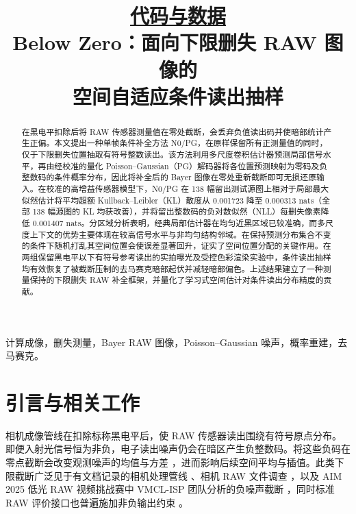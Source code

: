 \documentclass[10pt,twocolumn,journal]{IEEEtran}
\begin{document}
\title{{\normalsize \href{https://github.com/y-g-jiang/Video-RAW-Black-Level-Correction-Net/tree/main/below_zero}{代码与数据}}\\[6pt]Below Zero：面向下限删失 RAW 图像的\\空间自适应条件读出抽样}
\author{\BZAuthorBlockZH}
\maketitle
\thispagestyle{fancy}

\begin{abstract}
在黑电平扣除后将 RAW 传感器测量值在零处截断，会丢弃负值读出码并使暗部统计产生正偏。本文提出一种单帧条件补全方法 N0/PG，在原样保留所有正测量值的同时，仅于下限删失位置抽取有符号整数读出。该方法利用多尺度卷积估计器预测局部信号水平，再由经校准的量化 Poisson--Gaussian（PG）解码器将各位置预测映射为零码及负整数码的条件概率分布，因此将补全后的 Bayer 图像在零处重新截断即可无损还原输入。在校准的高增益传感器模型下，N0/PG 在 138 幅留出测试源图上相对于局部最大似然估计将平均超额 Kullback--Leibler（KL）散度从 0.001723 降至 0.000313 nats（全部 138 幅源图的 KL 均获改善），并将留出整数码的负对数似然（NLL）每删失像素降低 0.001407 nats。分区域分析表明，经典局部估计器在均匀近黑区域已较准确，而多尺度上下文的优势主要体现在较高信号水平与非均匀结构邻域。在保持预测分布集合不变的条件下随机打乱其空间位置会使误差显著回升，证实了空间位置分配的关键作用。在两组保留黑电平以下有符号参考读出的实拍曝光及受控色彩渲染实验中，条件读出抽样均有效恢复了被截断压制的去马赛克暗部起伏并减轻暗部偏色。上述结果建立了一种测量保持的下限删失 RAW 补全框架，并量化了学习式空间估计对条件读出分布精度的贡献。
\end{abstract}

\begin{IEEEkeywords}
计算成像，删失测量，Bayer RAW 图像，Poisson--Gaussian 噪声，概率重建，去马赛克。
\end{IEEEkeywords}

\section{引言与相关工作}
相机成像管线在扣除标称黑电平后，使 RAW 传感器读出围绕有符号原点分布。即便入射光信号恒为非负，电子读出噪声仍会在暗区产生负整数码。将这些负码在零点截断会改变观测噪声的均值与方差 \cite{foi2008,foi2009}，进而影响后续空间平均与插值。此类下限截断广泛见于有文档记录的相机处理管线 \cite{mathworksISP}、相机 RAW 文件调查 \cite{librawD5300,claffReadNoise}，以及 AIM 2025 低光 RAW 视频挑战赛中 VMCL-ISP 团队分析的负噪声截断 \cite{aim2025Video}，同时标准 RAW 评价接口也普遍施加非负输出约束 \cite{sonyAIM2025}。
\end{document}
